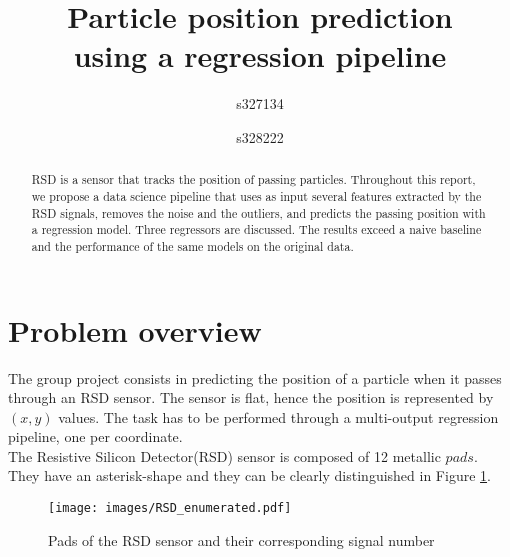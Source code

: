 \documentclass[conference]{IEEEtran}
\begin{document}
\title{Particle position prediction \\ using a regression pipeline}

\author{
s327134 \\
\and
{}
s328222 \\
}

\maketitle

\begin{abstract}
RSD is a sensor that tracks the position of passing particles. Throughout this report, we propose a data science pipeline that uses as input several features extracted by the RSD signals, removes the noise and the outliers, and predicts the passing position with a regression model. Three regressors are discussed. The results exceed a naive baseline and the performance of the same models on the original data.
\end{abstract}

\section{Problem overview}
\label{sec:problemOverview}
The group project consists in predicting the position of a particle when it passes through an RSD sensor. The sensor is flat, hence the position is represented by $(x, y)$ values. 
The task has to be performed through a multi-output regression pipeline, one per coordinate. \\
The Resistive Silicon Detector(RSD) sensor is composed of 12 metallic $pads$. They have an asterisk-shape and they can be clearly distinguished in Figure \ref{fig:rsd}.\\

\begin{figure}[htbp]
\centerline{\texttt{[image: images/RSD\_enumerated.pdf]}}
\caption{Pads of the RSD sensor and their corresponding signal number}
\label{fig:rsd}
\end{figure}
\end{document}
